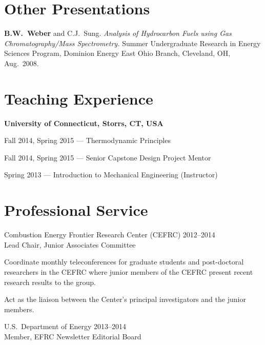 \section{{\sectionfont Other Presentations}}

\begin{bibmune}
\item \textbf{ B.W.\ Weber} and C.J.\ Sung. \textit{Analysis of
        Hydrocarbon Fuels using Gas Chromatography/Mass Spectrometry.}
        Summer Undergraduate Research in Energy Sciences Program,
        Dominion Energy East Ohio Branch, Cleveland, OH, Aug.\ 2008.
\end{bibmune}

\vspace{0.1in}

\section{{\sectionfont Teaching Experience}}

\textbf{University of Connecticut, Storrs, CT, USA}

\vspace{\baselineskip}
Fall 2014, Spring 2015 --- Thermodynamic Principles

Fall 2014, Spring 2015 --- Senior Capstone Design Project Mentor

Spring 2013 --- Introduction to Mechanical Engineering (Instructor)

\section{{\sectionfont Professional Service}}

Combustion Energy Frontier Research Center (CEFRC) \hfill 2012--2014\\
Lead Chair, Junior Associates Committee

\begin{innerlist}
\item[] Coordinate monthly teleconferences for graduate students
and post-doctoral researchers in the CEFRC where junior members of
the CEFRC present recent research results to the group.
\item[] Act as the liaison between the Center's principal investigators
and the junior members.
\end{innerlist}

\vspace{\baselineskip}

U.S.\ Department of Energy \hfill 2013--2014\\
Member, EFRC Newsletter Editorial Board

